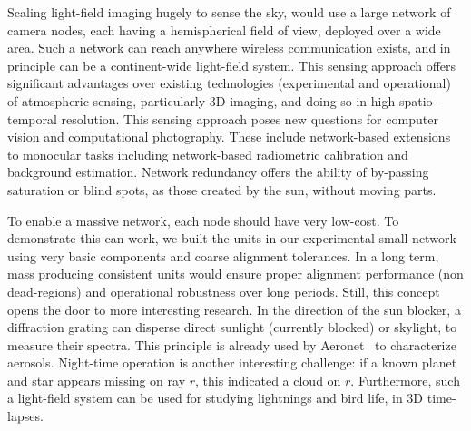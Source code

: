 \documentclass[runningheads]{llncs}
\begin{document}
Scaling light-field imaging hugely to sense the sky, would use  a large network of camera nodes, each having a hemispherical field of view, deployed over a wide area. Such a network can reach anywhere wireless communication exists, and in principle can be a continent-wide light-field system. This sensing approach offers significant advantages over existing technologies (experimental and operational) of atmospheric sensing, particularly  3D imaging, and doing so in high spatio-temporal resolution. This sensing approach poses new questions for computer vision and computational photography. These include network-based extensions to monocular tasks including network-based radiometric calibration and background estimation. Network redundancy offers the ability of by-passing saturation or blind spots, as those created by the sun, without moving parts.

To enable a massive network, each node should have very low-cost. To demonstrate this can work, we built the units in our experimental small-network using very basic components and coarse alignment tolerances. In a long term, mass producing consistent units would ensure proper alignment performance (non dead-regions) and operational robustness over long periods. Still, this concept opens the door to more interesting research. In the direction of the sun blocker, a diffraction grating can disperse direct sunlight (currently blocked) or skylight, to measure their spectra. This principle is already used by Aeronet~\cite{Holben1998} to characterize aerosols. Night-time operation is another interesting challenge: if a known planet and star appears missing on ray $r$, this indicated a cloud on $r$. Furthermore, such a light-field system can be used for studying lightnings and bird life, in 3D time-lapses.









\end{document}
